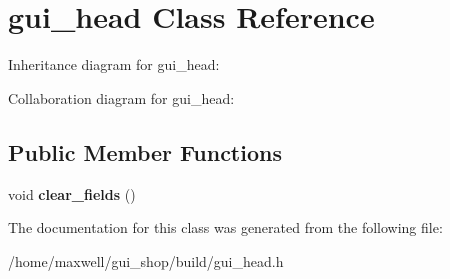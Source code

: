 \hypertarget{classgui__head}{}\section{gui\+\_\+head Class Reference}
\label{classgui__head}


Inheritance diagram for gui\+\_\+head\+:


Collaboration diagram for gui\+\_\+head\+:
\subsection*{Public Member Functions}
\begin{DoxyCompactItemize}
\item 
void {\bfseries clear\+\_\+fields} ()\hypertarget{classgui__head_a4e697fc5980dfa89a23f74c6a918dc63}{}\label{classgui__head_a4e697fc5980dfa89a23f74c6a918dc63}

\end{DoxyCompactItemize}


The documentation for this class was generated from the following file\+:\begin{DoxyCompactItemize}
\item 
/home/maxwell/gui\+\_\+shop/build/gui\+\_\+head.\+h\end{DoxyCompactItemize}

